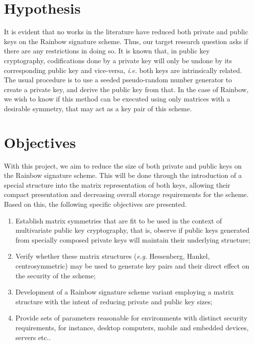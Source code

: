 \documentclass[10pt]{article}
\begin{document}
\section{Hypothesis}

It is evident that no works in the literature have reduced both private and public keys on the Rainbow signature scheme. Thus, our target research question asks if there are any restrictions in doing so. It is known that, in public key cryptography, codifications done by a private key will only be undone by its corresponding public key and vice-versa, \emph{i.e.} both keys are intrinsically related. The usual procedure is to use a seeded pseudo-random number generator to create a private key, and derive the public key from that. In the case of Rainbow, we wish to know if this method can be executed using only matrices with a desirable symmetry, that may act as a key pair of this scheme. 

\section{Objectives}

With this project, we aim to reduce the size of both private and public keys on the Rainbow signature scheme. This will be done through the introduction of a special structure into the matrix representation of both keys, allowing their compact presentation and decreasing overall storage requirements for the scheme. Based on this, the following specific objectives are presented.

\begin{enumerate}[label=\alph*.]
    \item Establish matrix symmetries that are fit to be used in the context of multivariate public key cryptography, that is, observe if public keys generated from specially composed private keys will maintain their underlying structure;
    \item Verify whether these matrix structures (\emph{e.g.} Hessenberg, Hankel, centrosymmetric) may be used to generate key pairs and their direct effect on the security of the scheme;
    \item Development of a Rainbow signature scheme variant employing a matrix structure with the intent of reducing private and public key sizes;
    \item Provide sets of parameters reasonable for environments with distinct security requirements, for instance, desktop computers, mobile and embedded devices, servers etc..
\end{enumerate}
\end{document}
